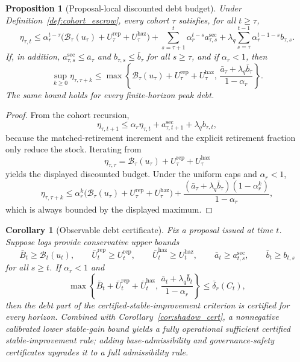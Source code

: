 \documentclass[11pt]{article}
\newtheorem{proposition}[theorem]{Proposition}
\newtheorem{corollary}[theorem]{Corollary}
\theoremstyle{definition}
\newcommand{\1}{\mathbf{1}}
\begin{document}
\begin{proposition}[Proposal-local discounted debt budget]\label{prop:local_debt_budget}
Under Definition~\ref{def:cohort_escrow}, every cohort $\tau$ satisfies, for all $t\ge \tau$,
\[
\eta_{\tau,t}
\le
\alpha_r^{t-\tau}\bigl(\mathcal B_\tau(u_\tau)+U_{\tau}^{\mathrm{rep}}+U_{\tau}^{\mathrm{haz}}\bigr)
+
\sum_{s=\tau+1}^{t}\alpha_r^{t-s} a_{\tau,s}^{\mathrm{sec}}
+
\lambda_q\sum_{s=\tau}^{t-1}\alpha_r^{t-1-s} b_{\tau,s}.
\]
If, in addition, $a_{\tau,s}^{\mathrm{sec}}\le \bar a_{\tau}$ and $b_{\tau,s}\le \bar b_{\tau}$ for all $s\ge \tau$, and if $\alpha_r<1$, then
\[
\sup_{k\ge 0}\eta_{\tau,\tau+k}
\le
\max\left\{\mathcal B_\tau(u_\tau)+U_{\tau}^{\mathrm{rep}}+U_{\tau}^{\mathrm{haz}},\, \frac{\bar a_{\tau}+\lambda_q \bar b_{\tau}}{1-\alpha_r}\right\}.
\]
The same bound holds for every finite-horizon peak debt.
\end{proposition}

\begin{proof}
From the cohort recursion,
\[
\eta_{\tau,t+1}
\le
\alpha_r\eta_{\tau,t} + a_{\tau,t+1}^{\mathrm{sec}} + \lambda_q b_{\tau,t},
\]
because the matched-retirement increment and the explicit retirement fraction only reduce the stock. Iterating from
\[
\eta_{\tau,\tau}=\mathcal B_\tau(u_\tau)+U_{\tau}^{\mathrm{rep}}+U_{\tau}^{\mathrm{haz}}
\]
yields the displayed discounted budget. Under the uniform caps and $\alpha_r<1$,
\[
\eta_{\tau,\tau+k}
\le
\alpha_r^k\bigl(\mathcal B_\tau(u_\tau)+U_{\tau}^{\mathrm{rep}}+U_{\tau}^{\mathrm{haz}}\bigr)
+
\frac{(\bar a_{\tau}+\lambda_q\bar b_{\tau})(1-\alpha_r^k)}{1-\alpha_r},
\]
which is always bounded by the displayed maximum.
\end{proof}

\begin{corollary}[Observable debt certificate]\label{cor:observable_debt_cert}
Fix a proposal issued at time $t$. Suppose logs provide conservative upper bounds
\[
\bar B_t\ge \mathcal B_t(u_t),\qquad
\bar U_t^{\mathrm{rep}}\ge U_t^{\mathrm{rep}},\qquad
\bar U_t^{\mathrm{haz}}\ge U_t^{\mathrm{haz}},\qquad
\bar a_t\ge a_{t,s}^{\mathrm{sec}},\qquad
\bar b_t\ge b_{t,s}
\]
for all $s\ge t$. If $\alpha_r<1$ and
\[
\max\left\{\bar B_t+\bar U_t^{\mathrm{rep}}+\bar U_t^{\mathrm{haz}},\, \frac{\bar a_t+\lambda_q \bar b_t}{1-\alpha_r}\right\}
\le \bar\delta_r(C_t),
\]
then the debt part of the certified-stable-improvement criterion is certified for every horizon. Combined with Corollary~\ref{cor:shadow_cert}, a nonnegative calibrated lower stable-gain bound yields a fully operational sufficient \emph{certified stable-improvement} rule; adding base-admissibility and governance-safety certificates upgrades it to a full admissibility rule.
\end{corollary}
\end{document}
